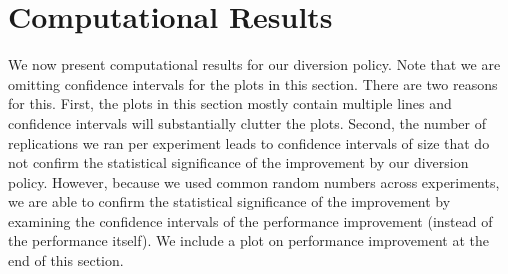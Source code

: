 \section{Computational Results}

We now present computational results for our diversion policy. Note that
we are omitting confidence intervals for the plots in this section. There
are two reasons for this. First, the plots in this section mostly
contain multiple lines and confidence intervals will substantially clutter
the plots. Second, the number of replications we ran per experiment
leads to confidence intervals of size that do not confirm the statistical
significance of the improvement by our diversion policy. However, because
we used common random numbers across experiments, we are able to confirm
the statistical significance of the improvement by examining the confidence
intervals of the performance improvement (instead of the performance itself).
We include a plot on performance improvement at the end of this section.





